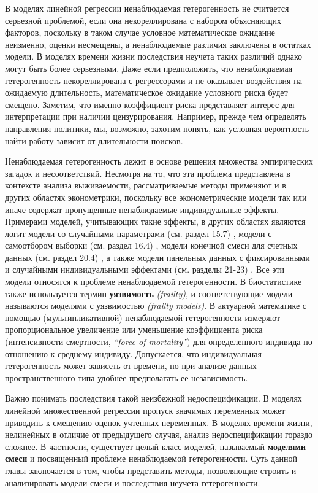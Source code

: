 В моделях линейной регрессии ненаблюдаемая гетерогенность не считается серьезной проблемой, если она некореллирована с набором объясняющих факторов, поскольку в таком случае условное математическое ожидание неизменно, оценки несмещены, а ненаблюдаемые различия заключены в остатках модели. В моделях времени жизни последствия неучета таких различий однако могут быть более серьезными. Даже если предположить, что ненаблюдаемая гетерогенность некореллирована с регрессорами и не оказывает воздействия на ожидаемую длительность, математическое ожидание условного риска будет смещено. Заметим, что именно коэффициент риска представляет интерес для интерпретации при наличии цензурирования. Например, прежде чем определять направления политики, мы, возможно, захотим понять, как условная вероятность найти работу зависит от длительности поисков.

Ненаблюдаемая гетерогенность лежит в основе решения множества эмпирических загадок и несоответствий. Несмотря на то, что эта проблема представлена в контексте анализа выживаемости, рассматриваемые методы применяют и в других областях эконометрики, поскольку все эконометрические модели так или иначе содержат пропущенные ненаблюдаемые индивидуальные эффекты. Примерами моделей, учитывающих такие эффекты, в других областях являются логит-модели со случайными параметрами (см. раздел 15.7)%
, модели с самоотбором выборки (см. раздел 16.4)%
, модели конечной смеси для счетных данных (см. раздел 20.4)%
, а также модели панельных данных с фиксированными и случайными индивидуальными эффектами (см. разделы 21-23)%
. %
Все эти модели относятся к проблеме ненаблюдаемой гетерогенности. В биостатистике также используется термин \textbf{уязвимость} \textit{(frailty)}, и соответствующие модели называются моделями с уязвимостью \textit{(frailty models)}. В актуарной математике с помощью (мультипликативной) ненаблюдаемой гетерогенности измеряют пропорциональное увеличение или уменьшение коэффициента риска (интенсивности смертности, \textit{``force of mortality''}) для определенного индивида по отношению к среднему индивиду. Допускается, что индивидуальная гетерогенность может зависеть от времени, но при анализе данных пространственного типа удобнее предполагать ее независимость.

Важно понимать последствия такой неизбежной недоспецификации. В моделях линейной множественной регрессии пропуск значимых переменных может приводить к смещению оценок учтенных переменных. В моделях времени жизни, нелинейных в отличие от предыдущего случая, анализ недоспецификации гораздо сложнее. В частности, существует целый класс моделей, называемый \textbf{моделями смеси} и посвященный проблеме ненаблюдаемой гетерогенности. Суть данной главы заключается в том, чтобы представить методы, позволяющие строить и анализировать модели смеси и последствия неучета гетерогенности.

